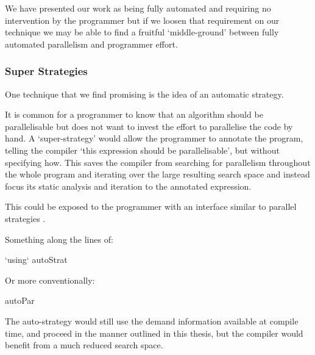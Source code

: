 We have presented our work as being fully automated and requiring no
intervention by the programmer but if we loosen that requirement on
our technique we may be able to find a fruitful `middle-ground' between
fully automated parallelism and programmer effort.

\subsubsection{Super Strategies}

One technique that we find promising is the idea of an automatic strategy.

It is common for a programmer to know that an algorithm should be
parallelisable but does not want to invest the effort to parallelise the code
by hand. A `super-strategy' would allow the programmer to annotate the program,
telling the compiler `this expression should be parallelisable', but without
specifying how. This saves the compiler from searching for parallelism
throughout the whole program and iterating over the large resulting search
space and instead focus its static analysis and iteration to the annotated
expression.

This could be exposed to the programmer with an interface similar to parallel
strategies \citep{strategies}.

Something along the lines of:

\begin{haskell}
 `using` autoStrat
\end{haskell}

Or more conventionally:

\begin{haskell}
autoPar 
\end{haskell}

The auto-strategy would still use the demand information available at compile
time, and proceed in the manner outlined in this thesis, but the compiler would
benefit from a much reduced search space.
